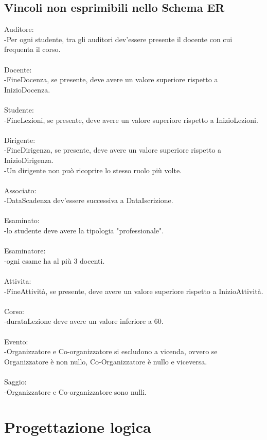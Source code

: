 \documentclass[11pt]{article}
\begin{document}
	\subsection{Vincoli non esprimibili nello Schema ER}
		Auditore:\\ -Per ogni studente, tra gli auditori dev'essere presente il docente con cui frequenta il corso.\\\\ Docente:\\ -FineDocenza, se presente, deve avere un valore superiore rispetto a InizioDocenza.\\\\ Studente:\\ -FineLezioni, se presente, deve avere un valore superiore rispetto a InizioLezioni.\\\\ Dirigente:\\ -FineDirigenza, se presente, deve avere un valore superiore rispetto a InizioDirigenza.\\ -Un dirigente non può ricoprire lo stesso ruolo più volte.\\\\ Associato:\\ -DataScadenza dev'essere successiva a DataIscrizione.\\\\ Esaminato:\\ -lo studente deve avere la tipologia "professionale".\\\\ Esaminatore:\\ -ogni esame ha al più 3 docenti.\\\\ Attivita:\\ -FineAttività, se presente, deve avere un valore superiore rispetto a InizioAttività.\\\\ Corso:\\ -durataLezione deve avere un valore inferiore a 60.\\\\ Evento:\\ -Organizzatore e Co-organizzatore si escludono a vicenda, ovvero se Organizzatore è non nullo, Co-Organizzatore è nullo e viceversa.\\\\ Saggio:\\ -Organizzatore e Co-organizzatore sono nulli.
\section{Progettazione logica}
\end{document}
